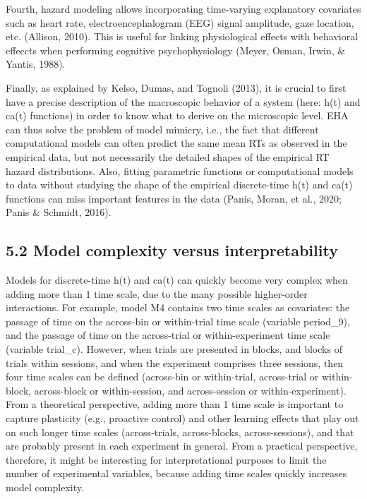 \documentclass[
  man,floatsintext]{apa6}
\begin{document}
Fourth, hazard modeling allows incorporating time-varying explanatory covariates such as heart rate, electroencephalogram (EEG) signal amplitude, gaze location, etc. (Allison, 2010). This is useful for linking physiological effects with behavioral effeccts when performing cognitive psychophysiology (Meyer, Osman, Irwin, \& Yantis, 1988).

Finally, as explained by Kelso, Dumas, and Tognoli (2013), it is crucial to first have a precise description of the macroscopic behavior of a system (here: h(t) and ca(t) functions) in order to know what to derive on the microscopic level. EHA can thus solve the problem of model mimicry, i.e., the fact that different computational models can often predict the same mean RTs as observed in the empirical data, but not necessarily the detailed shapes of the empirical RT hazard distributions. Also, fitting parametric functions or computational models to data without studying the shape of the empirical discrete-time h(t) and ca(t) functions can miss important features in the data (Panis, Moran, et al., 2020; Panis \& Schmidt, 2016).

\subsection{5.2 Model complexity versus interpretability}\label{model-complexity-versus-interpretability}

Models for discrete-time h(t) and ca(t) can quickly become very complex when adding more than 1 time scale, due to the many possible higher-order interactions.
For example, model M4 contains two time scales as covariates: the passage of time on the across-bin or within-trial time scale (variable period\_9), and the passage of time on the across-trial or within-experiment time scale (variable trial\_c). However, when trials are presented in blocks, and blocks of trials within sessions, and when the experiment comprises three sessions, then four time scales can be defined (across-bin or within-trial, across-trial or within-block, across-block or within-session, and across-session or within-experiment).
From a theoretical perspective, adding more than 1 time scale is important to capture plasticity (e.g., proactive control) and other learning effects that play out on such longer time scales (across-trials, across-blocks, across-sessions), and that are probably present in each experiment in general.
From a practical perspective, therefore, it might be interesting for interpretational purposes to limit the number of experimental variables, because adding time scales quickly increases model complexity.
\end{document}
